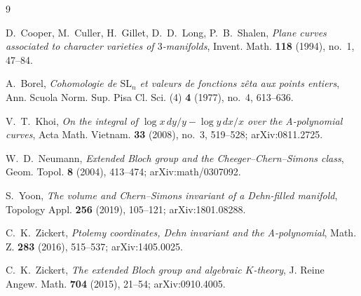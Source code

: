 \documentclass[11pt]{article}
\theoremstyle{definition}
\begin{document}
\begin{thebibliography}{9}

D.~Cooper, M.~Culler, H.~Gillet, D.~D.~Long, P.~B.~Shalen,
\emph{Plane curves associated to character varieties of $3$-manifolds},
Invent. Math. \textbf{118} (1994), no.~1, 47--84.

A.~Borel,
\emph{Cohomologie de $\mathrm{SL}_n$ et valeurs de fonctions z\^eta aux points entiers},
Ann. Scuola Norm. Sup. Pisa Cl. Sci. (4) \textbf{4} (1977), no.~4, 613--636.

V.~T.~Khoi,
\emph{On the integral of $\log x\,dy/y-\log y\,dx/x$ over the A-polynomial curves},
Acta Math. Vietnam. \textbf{33} (2008), no.~3, 519--528;
arXiv:0811.2725.

W.~D.~Neumann,
\emph{Extended Bloch group and the Cheeger--Chern--Simons class},
Geom. Topol. \textbf{8} (2004), 413--474;
arXiv:math/0307092.

S.~Yoon,
\emph{The volume and Chern--Simons invariant of a Dehn-filled manifold},
Topology Appl. \textbf{256} (2019), 105--121;
arXiv:1801.08288.

C.~K.~Zickert,
\emph{Ptolemy coordinates, Dehn invariant and the A-polynomial},
Math. Z. \textbf{283} (2016), 515--537;
arXiv:1405.0025.

C.~K.~Zickert,
\emph{The extended Bloch group and algebraic $K$-theory},
J. Reine Angew. Math. \textbf{704} (2015), 21--54;
arXiv:0910.4005.

\end{thebibliography}
\end{document}
